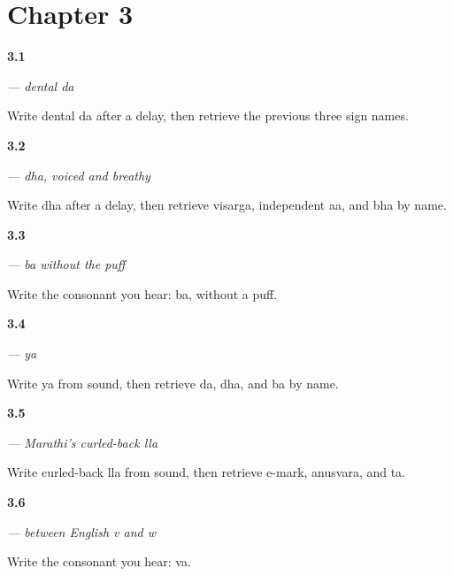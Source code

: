 \section*{Chapter 3}

\noindent\begin{minipage}[t]{\linewidth}
\raggedright
\hypertarget{review-MR-W03-da-r1}{\textbf{3.1}} \emph{ — dental da}\par
\small Write dental da after a delay, then retrieve the previous three sign names.
\end{minipage}\par\medskip

\noindent\begin{minipage}[t]{\linewidth}
\raggedright
\hypertarget{review-MR-W03-dha-r2-a}{\textbf{3.2}} \emph{ — dha, voiced and breathy}\par
\small Write dha after a delay, then retrieve visarga, independent aa, and bha by name.
\end{minipage}\par\medskip

\noindent\begin{minipage}[t]{\linewidth}
\raggedright
\hypertarget{review-MR-W03-ba-dictation}{\textbf{3.3}} \emph{ — ba without the puff}\par
\small Write the consonant you hear: ba, without a puff.
\end{minipage}\par\medskip

\noindent\begin{minipage}[t]{\linewidth}
\raggedright
\hypertarget{review-MR-W03-ya-r1}{\textbf{3.4}} \emph{ — ya}\par
\small Write ya from sound, then retrieve da, dha, and ba by name.
\end{minipage}\par\medskip

\noindent\begin{minipage}[t]{\linewidth}
\raggedright
\hypertarget{review-MR-W03-lla-r2-b}{\textbf{3.5}} \emph{ — Marathi's curled-back lla}\par
\small Write curled-back lla from sound, then retrieve e-mark, anusvara, and ta.
\end{minipage}\par\medskip

\noindent\begin{minipage}[t]{\linewidth}
\raggedright
\hypertarget{review-MR-W03-va-dictation}{\textbf{3.6}} \emph{ — between English v and w}\par
\small Write the consonant you hear: va.
\end{minipage}\par\medskip

